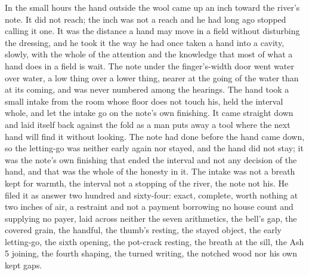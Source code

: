 In the small hours the hand outside the wool came up an inch toward the river's note. It did not reach; the inch was not a reach and he had long ago stopped calling it one. It was the distance a hand may move in a field without disturbing the dressing, and he took it the way he had once taken a hand into a cavity, slowly, with the whole of the attention and the knowledge that most of what a hand does in a field is wait. The note under the finger's-width door went water over water, a low thing over a lower thing, nearer at the going of the water than at its coming, and was never numbered among the hearings. The hand took a small intake from the room whose floor does not touch his, held the interval whole, and let the intake go on the note's own finishing. It came straight down and laid itself back against the fold as a man puts away a tool where the next hand will find it without looking. The note had done before the hand came down, so the letting-go was neither early again nor stayed, and the hand did not stay; it was the note's own finishing that ended the interval and not any decision of the hand, and that was the whole of the honesty in it. The intake was not a breath kept for warmth, the interval not a stopping of the river, the note not his. He filed it as answer two hundred and sixty-four: exact, complete, worth nothing at two inches of air, a restraint and not a payment borrowing no house count and supplying no payer, laid across neither the seven arithmetics, the bell's gap, the covered grain, the handful, the thumb's resting, the stayed object, the early letting-go, the sixth opening, the pot-crack resting, the breath at the sill, the Ash 5 joining, the fourth shaping, the turned writing, the notched wood nor his own kept gaps.

